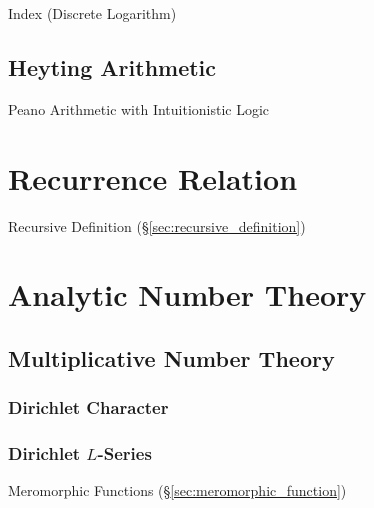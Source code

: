 Index (Discrete Logarithm) %



\subsection{Heyting Arithmetic}\label{sec:heyting_arithmetic}

Peano Arithmetic with Intuitionistic Logic



\section{Recurrence Relation}\label{sec:recurrence_relation}

Recursive Definition (\S\ref{sec:recursive_definition})



\section{Analytic Number Theory}\label{sec:analytic_number_theory}

\subsection{Multiplicative Number Theory}
\label{sec:multiplicative_number_theory}

\subsubsection{Dirichlet Character}\label{sec:dirichlet_character}

\subsubsection{Dirichlet $L$-Series}\label{sec:l_series}

Meromorphic Functions (\S\ref{sec:meromorphic_function})



